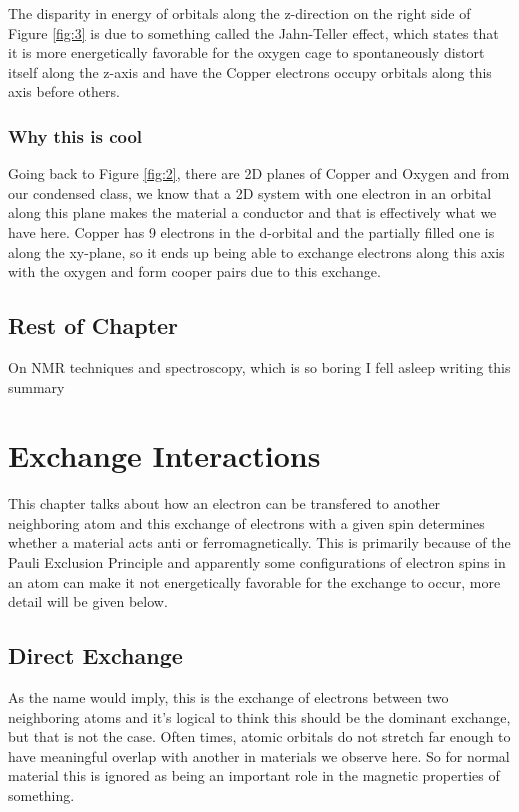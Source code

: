 \documentclass[11pt,onecolumn]{article}
\begin{document}
The disparity in energy of orbitals along the z-direction on the right side of Figure \ref{fig:3} is due to something called the Jahn-Teller effect, which states that it is more energetically favorable for the oxygen cage to spontaneously distort itself along the z-axis and have the Copper electrons occupy orbitals along this axis before others.

\subsubsection{Why this is cool}

Going back to Figure \ref{fig:2}, there are 2D planes of Copper and Oxygen and from our condensed class, we know that a 2D system with one electron in an orbital along this plane makes the material a conductor and that is effectively what we have here. Copper has 9 electrons in the d-orbital and the partially filled one is along the xy-plane, so it ends up being able to exchange electrons along this axis with the oxygen and form cooper pairs due to this exchange.

\subsection{Rest of Chapter}

On NMR techniques and spectroscopy, which is so boring I fell asleep writing this summary

\section{Exchange Interactions}

This chapter talks about how an electron can be transfered to another neighboring atom and this exchange of electrons with a given spin determines whether a material acts anti or ferromagnetically. This is primarily because of the Pauli Exclusion Principle and apparently some configurations of electron spins in an atom can make it not energetically favorable for the exchange to occur, more detail will be given below.

\subsection{Direct Exchange}

As the name would imply, this is the exchange of electrons between two neighboring atoms and it's logical to think this should be the dominant exchange, but that is not the case. Often times, atomic orbitals do not stretch far enough to have meaningful overlap with another in materials we observe here. So for normal material this is ignored as being an important role in the magnetic properties of something.
\end{document}
